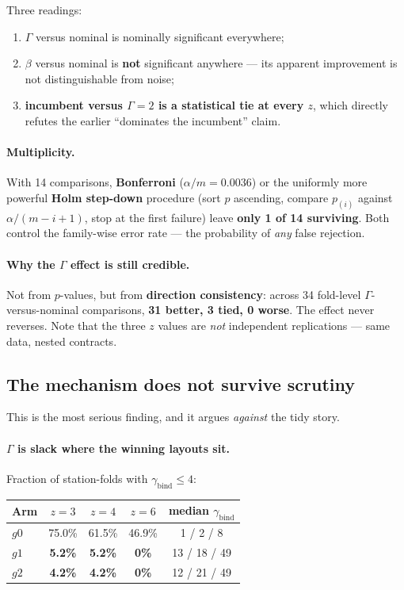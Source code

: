 \documentclass[11pt,a4paper]{article}
\newcommand{\gbind}{\gamma_{\mathrm{bind}}}
\begin{document}
Three readings:

\begin{enumerate}
  \item $\Gamma$ versus nominal is nominally significant everywhere;
  \item $\beta$ versus nominal is \textbf{not} significant anywhere --- its
        apparent improvement is not distinguishable from noise;
  \item \textbf{incumbent versus $\Gamma=2$ is a statistical tie at every $z$},
        which directly refutes the earlier ``dominates the incumbent'' claim.
\end{enumerate}

\paragraph{Multiplicity.} With 14 comparisons, \textbf{Bonferroni}
($\alpha/m = 0.0036$) or the uniformly more powerful \textbf{Holm step-down}
procedure (sort $p$ ascending, compare $p_{(i)}$ against $\alpha/(m-i+1)$, stop
at the first failure) leave \textbf{only 1 of 14 surviving}. Both control the
family-wise error rate --- the probability of \emph{any} false rejection.

\paragraph{Why the $\Gamma$ effect is still credible.} Not from $p$-values, but
from \textbf{direction consistency}: across 34 fold-level
$\Gamma$-versus-nominal comparisons, \textbf{31 better, 3 tied, 0 worse}. The
effect never reverses. Note that the three $z$ values are \emph{not} independent
replications --- same data, nested contracts.

\subsection{The mechanism does not survive scrutiny}
\label{sec:mechanism}

This is the most serious finding, and it argues \emph{against} the tidy story.

\paragraph{$\Gamma$ is slack where the winning layouts sit.}
Fraction of station-folds with $\gbind\le4$:

\begin{center}
\begin{tabular}{lcccc}
\toprule
Arm & $z=3$ & $z=4$ & $z=6$ & median $\gbind$ \\
\midrule
$g0$ & 75.0\% & 61.5\% & 46.9\% & 1 / 2 / 8 \\
$g1$ & \textbf{5.2\%} & \textbf{5.2\%} & \textbf{0\%} & 13 / 18 / 49 \\
$g2$ & \textbf{4.2\%} & \textbf{4.2\%} & \textbf{0\%} & 12 / 21 / 49 \\
\bottomrule
\end{tabular}
\end{center}
\end{document}
